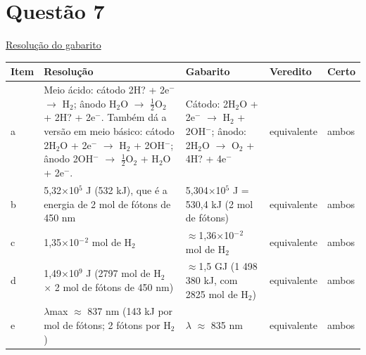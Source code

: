 \documentclass{article}%
\begin{document}
\section*{Questão 7}%
\href{https://poliedroresolve.sistemapoliedro.com.br/vestibulares/ita/2026/ita-2-fase-dia-2-29-10-2025-2-fase-dia-2/dissertativa-7-quimica-2-fase-dia-2-ita-2026}{Resolução do gabarito}\par\smallskip%
\begin{longtable}{@{}p{} p{} p{} p{} p{}@{}}\toprule Item & Resolução & Gabarito & Veredito & Certo \\ \midrule
a & Meio ácido: cátodo 2H? + 2e$^{-}$ $\to$ H$_{2}$; ânodo H$_{2}$O $\to$ $\frac12$O$_{2}$ + 2H? + 2e$^{-}$. Também dá a versão em meio básico: cátodo 2H$_{2}$O + 2e$^{-}$ $\to$ H$_{2}$ + 2OH$^{-}$; ânodo 2OH$^{-}$ $\to$ $\frac12$O$_{2}$ + H$_{2}$O + 2e$^{-}$. & Cátodo: 2H$_{2}$O + 2e$^{-}$ $\to$ H$_{2}$ + 2OH$^{-}$; ânodo: 2H$_{2}$O $\to$ O$_{2}$ + 4H? + 4e$^{-}$ & equivalente & ambos \\
b & 5,32$\times$10$^{5}$ J (532 kJ), que é a energia de 2 mol de fótons de 450 nm & 5,304$\times$10$^{5}$ J = 530,4 kJ (2 mol de fótons) & equivalente & ambos \\
c & 1,35$\times$10$^{-}$$^2$ mol de H$_{2}$ & $\approx$1,36$\times$10$^{-}$$^2$ mol de H$_{2}$ & equivalente & ambos \\
d & 1,49$\times$10$^{9}$ J (2797 mol de H$_{2}$ $\times$ 2 mol de fótons de 450 nm) & $\approx$1,5 GJ (1 498 380 kJ, com 2825 mol de H$_{2}$) & equivalente & ambos \\
e & $\lambda$max $\approx$ 837 nm (143 kJ por mol de fótons; 2 fótons por H$_{2}$) & $\lambda$ $\approx$ 835 nm & equivalente & ambos \\
\bottomrule\end{longtable}%
\end{document}
